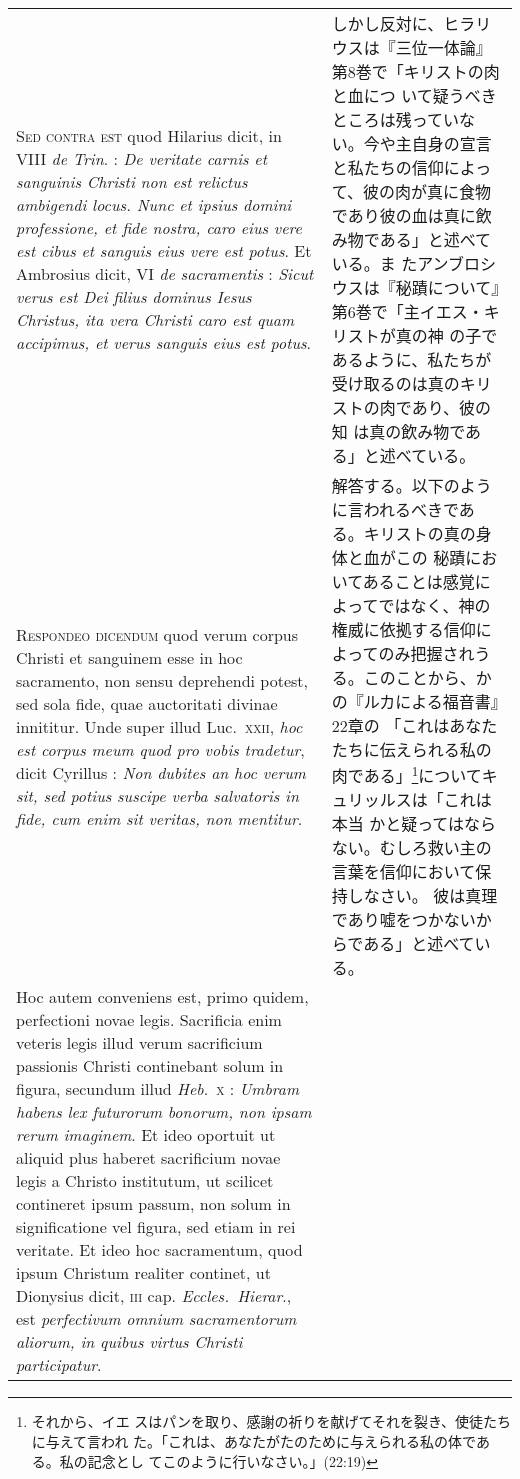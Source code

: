 \documentclass[10pt]{jsarticle} %
\begin{document}
\begin{longtable}{p{21em}p{21em}}
\\




{\scshape Sed contra est} quod Hilarius dicit, in VIII {\itshape de Trin}. : {\itshape De veritate
carnis et sanguinis Christi non est relictus ambigendi locus. Nunc et
ipsius domini professione, et fide nostra, caro eius vere est cibus et
sanguis eius vere est potus}. Et Ambrosius dicit, VI {\itshape de
 sacramentis} : {\itshape Sicut verus est Dei filius dominus Iesus Christus, ita vera Christi
caro est quam accipimus, et verus sanguis eius est potus}.

&

しかし反対に、ヒラリウスは『三位一体論』第8巻で「キリストの肉と血につ
 いて疑うべきところは残っていない。今や主自身の宣言と私たちの信仰によっ
 て、彼の肉が真に食物であり彼の血は真に飲み物である」と述べている。ま
 たアンブロシウスは『秘蹟について』第6巻で「主イエス・キリストが真の神
 の子であるように、私たちが受け取るのは真のキリストの肉であり、彼の知
 は真の飲み物である」と述べている。


\\




{\scshape Respondeo dicendum} quod verum corpus Christi et sanguinem esse in hoc
sacramento, non sensu deprehendi potest, sed sola fide, quae
auctoritati divinae innititur. Unde super illud Luc.~{\scshape xxii}, {\itshape hoc est
corpus meum quod pro vobis tradetur}, dicit Cyrillus : {\itshape Non dubites an
hoc verum sit, sed potius suscipe verba salvatoris in fide, cum enim
sit veritas, non mentitur}. 


&

解答する。以下のように言われるべきである。キリストの真の身体と血がこの
 秘蹟においてあることは感覚によってではなく、神の権威に依拠する信仰に
 よってのみ把握されうる。このことから、かの『ルカによる福音書』22章の
 「これはあなたたちに伝えられる私の肉である」\footnote{それから、イエ
 スはパンを取り、感謝の祈りを献げてそれを裂き、使徒たちに与えて言われ
 た。「これは、あなたがたのために与えられる私の体である。私の記念とし
 てこのように行いなさい。」(22:19)}についてキュリッルスは「これは本当
 かと疑ってはならない。むしろ救い主の言葉を信仰において保持しなさい。
 彼は真理であり嘘をつかないからである」と述べている。


\\


Hoc autem conveniens est, primo quidem,
perfectioni novae legis. Sacrificia enim veteris legis illud verum
sacrificium passionis Christi continebant solum in figura, secundum
illud {\itshape Heb}.~{\scshape x} : {\itshape Umbram habens lex futurorum bonorum, non ipsam rerum
imaginem}. Et ideo oportuit ut aliquid plus haberet sacrificium novae
legis a Christo institutum, ut scilicet contineret ipsum passum, non
solum in significatione vel figura, sed etiam in rei veritate. Et ideo
hoc sacramentum, quod ipsum Christum realiter continet, ut Dionysius
dicit, {\scshape iii} cap. {\itshape Eccles.~Hierar}., est {\itshape perfectivum omnium sacramentorum
aliorum, in quibus virtus Christi participatur}. 



\end{longtable}
\end{document}
